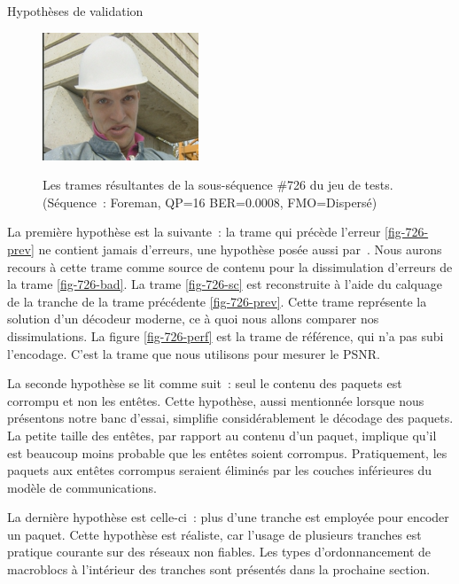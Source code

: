 \begin{section}{Hypothèses de validation}
\begin{figure}
{{{				\label{fig-726-perf}
				\includegraphics[width=0.46\linewidth]{images/perfForeman.png}}
		}
	}
	\caption[Trames résultantes de la sous-séquence \#726 du jeu de tests]{Les
trames résultantes de la sous-séquence \#726 du jeu de tests. (Séquence~:
Foreman, QP=16 BER=0.0008, FMO=Dispersé)}
	\label{fig-726}
\end{figure}

La première hypothèse est la suivante~: la trame qui précède l'erreur
\ref{fig-726-prev} ne contient jamais d'erreurs, une hypothèse posée aussi
par~\citep{Superiori2007}. Nous aurons recours à cette trame comme source de
contenu pour la dissimulation d'erreurs de la trame \ref{fig-726-bad}. La
trame \ref{fig-726-sc} est reconstruite à l'aide du calquage de la tranche de
la trame précédente \ref{fig-726-prev}. Cette trame représente la solution
d'un décodeur moderne, ce à quoi nous allons comparer nos dissimulations. La
figure \ref{fig-726-perf} est la trame de référence, qui n'a pas subi
l'encodage. C'est la trame que nous utilisons pour mesurer le PSNR.

La seconde hypothèse se lit comme suit~: seul le contenu des paquets est
corrompu et non les entêtes. Cette hypothèse, aussi mentionnée lorsque nous
présentons notre banc d'essai, simplifie considérablement le décodage des
paquets. La petite taille des entêtes, par rapport au contenu d'un paquet,
implique qu'il est beaucoup moins probable que les entêtes soient corrompus.
Pratiquement, les paquets aux entêtes corrompus seraient éliminés par les
couches inférieures du modèle de communications.

La dernière hypothèse est celle-ci~: plus d'une tranche est employée pour
encoder un paquet. Cette hypothèse est réaliste, car l'usage de plusieurs
tranches est pratique courante sur des réseaux non fiables. Les types
d'ordonnancement de macroblocs à l'intérieur des tranches sont présentés dans la
prochaine section.

\end{section}

